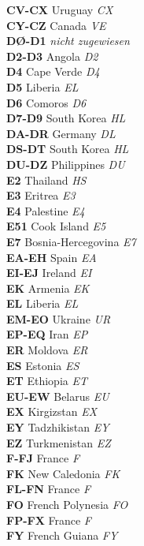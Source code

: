 \documentclass[landscape,a4paper]{article}
\begin{document}
\begin{multicols}{7}
\textbf{CV-CX} Uruguay \emph{CX} \\
\textbf{CY-CZ} Canada \emph{VE} \\
\textbf{DØ-D1} \emph{nicht zugewiesen} \\
\textbf{D2-D3} Angola \emph{D2} \\
\textbf{D4} Cape Verde \emph{D4} \\
\textbf{D5} Liberia \emph{EL} \\
\textbf{D6} Comoros \emph{D6} \\
\textbf{D7-D9} South Korea \emph{HL} \\
\textbf{DA-DR} Germany \emph{DL} \\
\textbf{DS-DT} South Korea \emph{HL} \\
\textbf{DU-DZ} Philippines \emph{DU} \\
\textbf{E2} Thailand \emph{HS} \\
\textbf{E3} Eritrea \emph{E3} \\
\textbf{E4} Palestine \emph{E4} \\
\textbf{E51} Cook Island \emph{E5} \\
\textbf{E7} Bosnia-Hercegovina \emph{E7} \\
\textbf{EA-EH} Spain \emph{EA} \\
\textbf{EI-EJ} Ireland \emph{EI} \\
\textbf{EK} Armenia \emph{EK} \\
\textbf{EL} Liberia \emph{EL} \\
\textbf{EM-EO} Ukraine \emph{UR} \\
\textbf{EP-EQ} Iran \emph{EP} \\
\textbf{ER} Moldova \emph{ER} \\
\textbf{ES} Estonia \emph{ES} \\
\textbf{ET} Ethiopia \emph{ET} \\
\textbf{EU-EW} Belarus \emph{EU} \\
\textbf{EX} Kirgizstan \emph{EX} \\
\textbf{EY} Tadzhikistan \emph{EY} \\
\textbf{EZ} Turkmenistan \emph{EZ} \\
\textbf{F-FJ} France \emph{F} \\
\textbf{FK} New Caledonia \emph{FK} \\
\textbf{FL-FN} France \emph{F} \\
\textbf{FO} French Polynesia \emph{FO} \\
\textbf{FP-FX} France \emph{F} \\
\textbf{FY} French Guiana \emph{FY} \\

\end{multicols}
\end{document}
